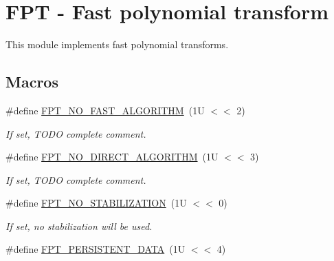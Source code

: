 \hypertarget{group__fpt}{\section{F\-P\-T -\/ Fast polynomial transform}
\label{group__fpt}
}


This module implements fast polynomial transforms.  


\subsection*{Macros}
\begin{DoxyCompactItemize}
\item 
\hypertarget{group__fpt_ga33b9330253f419a91ef09a1b0d7a2667}{\#define \hyperlink{group__fpt_ga33b9330253f419a91ef09a1b0d7a2667}{F\-P\-T\-\_\-\-N\-O\-\_\-\-F\-A\-S\-T\-\_\-\-A\-L\-G\-O\-R\-I\-T\-H\-M}~(1\-U $<$$<$ 2)}\label{group__fpt_ga33b9330253f419a91ef09a1b0d7a2667}

\begin{DoxyCompactList}\small\item\em If set, T\-O\-D\-O complete comment. \end{DoxyCompactList}\item 
\hypertarget{group__fpt_gadbf3440a08ccd763556ff4caa36693d9}{\#define \hyperlink{group__fpt_gadbf3440a08ccd763556ff4caa36693d9}{F\-P\-T\-\_\-\-N\-O\-\_\-\-D\-I\-R\-E\-C\-T\-\_\-\-A\-L\-G\-O\-R\-I\-T\-H\-M}~(1\-U $<$$<$ 3)}\label{group__fpt_gadbf3440a08ccd763556ff4caa36693d9}

\begin{DoxyCompactList}\small\item\em If set, T\-O\-D\-O complete comment. \end{DoxyCompactList}\item 
\hypertarget{group__fpt_ga43cffc40fea4280ae0bcbe948109a3be}{\#define \hyperlink{group__fpt_ga43cffc40fea4280ae0bcbe948109a3be}{F\-P\-T\-\_\-\-N\-O\-\_\-\-S\-T\-A\-B\-I\-L\-I\-Z\-A\-T\-I\-O\-N}~(1\-U $<$$<$ 0)}\label{group__fpt_ga43cffc40fea4280ae0bcbe948109a3be}

\begin{DoxyCompactList}\small\item\em If set, no stabilization will be used. \end{DoxyCompactList}\item 
\hypertarget{group__fpt_ga1ee771544214aba96ee012095feeead1}{\#define \hyperlink{group__fpt_ga1ee771544214aba96ee012095feeead1}{F\-P\-T\-\_\-\-P\-E\-R\-S\-I\-S\-T\-E\-N\-T\-\_\-\-D\-A\-T\-A}~(1\-U $<$$<$ 4)}\label{group__fpt_ga1ee771544214aba96ee012095feeead1}


\end{DoxyCompactItemize}
